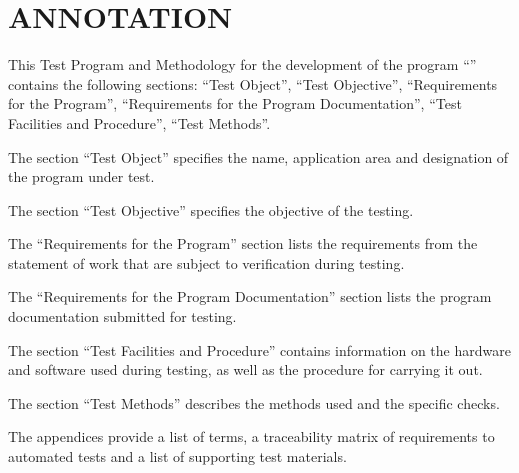 \documentclass[12pt,a4paper]{extarticle}
\begin{document}
\sloppy





\section*{ANNOTATION}

This Test Program and Methodology for the development of the program \enquote{\hseProjectName} contains the following sections: \enquote{Test Object}, \enquote{Test Objective}, \enquote{Requirements for the Program}, \enquote{Requirements for the Program Documentation}, \enquote{Test Facilities and Procedure}, \enquote{Test Methods}.

The section \enquote{Test Object} specifies the name, application area and designation of the program under test.

The section \enquote{Test Objective} specifies the objective of the testing.

The \enquote{Requirements for the Program} section lists the requirements from the statement of work that are subject to verification during testing.

The \enquote{Requirements for the Program Documentation} section lists the program documentation submitted for testing.

The section \enquote{Test Facilities and Procedure} contains information on the hardware and software used during testing, as well as the procedure for carrying it out.

The section \enquote{Test Methods} describes the methods used and the specific checks.

The appendices provide a list of terms, a traceability matrix of requirements to automated tests and a list of supporting test materials.
\end{document}
